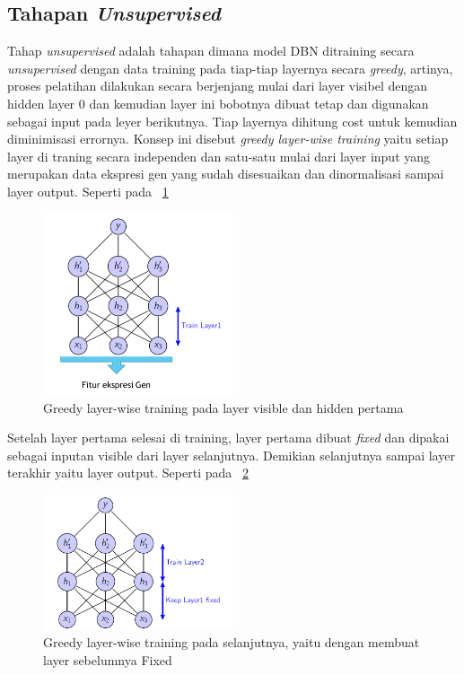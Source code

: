 \subsection{Tahapan \textit{Unsupervised}}
Tahap \textit{unsupervised} adalah tahapan dimana model DBN ditraining secara \textit{unsupervised} dengan data training pada tiap-tiap layernya secara \textit{greedy}, artinya, proses pelatihan dilakukan secara berjenjang mulai dari layer visibel dengan hidden layer 0 dan kemudian layer ini bobotnya dibuat tetap dan digunakan sebagai input pada leyer berikutnya. Tiap layernya dihitung cost untuk kemudian diminimisasi errornya. Konsep ini disebut \textit{greedy layer-wise training} yaitu setiap layer di traning secara independen dan satu-satu mulai dari layer input yang merupakan data ekspresi gen yang sudah disesuaikan dan dinormalisasi sampai layer output. Seperti pada \pic~\ref{fig:greedy1}

\begin{figure}
	\centering
	\includegraphics[width=0.5\textwidth]
		{pics/greedy1.png}
	\caption{Greedy layer-wise training pada layer visible dan hidden pertama\citep{duh2014deep}}
	\label{fig:greedy1}
\end{figure}

Setelah layer pertama selesai di training, layer pertama dibuat \textit{fixed} dan dipakai sebagai inputan visible dari layer selanjutnya. Demikian selanjutnya sampai layer terakhir yaitu layer output. Seperti pada \pic~\ref{fig:greedy2}

\begin{figure}
	\centering
	\includegraphics[width=0.5\textwidth]
		{pics/greedy2.png}
	\caption{Greedy layer-wise training pada selanjutnya, yaitu dengan membuat layer sebelumnya Fixed \citep{duh2014deep}}
	\label{fig:greedy2}
\end{figure}


